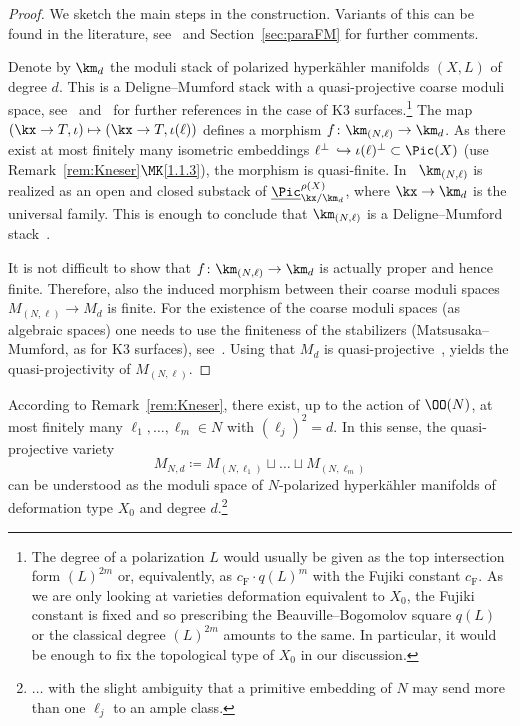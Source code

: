 \begin{proof}
We sketch the main steps in the construction. Variants of this can be found in the literature, see~\cite{Beauv,Dolg} and Section~\ref{sec:paraFM} for further comments.

Denote by $\km_d$ the moduli stack of polarized hyperk\"ahler manifolds $(X,L)$ of degree $d$. This is a Deligne--Mumford stack with a quasi-projective coarse moduli space, see~\cite{Viehweg} and~\cite[Chapter~5]{HuyK3} for further references in the case of K3 surfaces.\footnote{The degree of a polarization $L$ would usually be given as the top intersection form $(L)^{2m}$ or, equivalently, as $c_{\text{F}}\cdot q(L)^m$ with the Fujiki constant $c_{\text{F}}$. As we are only looking at varieties deformation equivalent to $X_0$, the Fujiki constant is fixed and so prescribing the Beauville--Bogomolov square $q(L)$ or the classical degree $(L)^{2m}$ amounts to the same. In particular, it would be enough to fix the topological type of $X_0$ in our discussion.} The map $(\kx\to T,\iota)\mapsto (\kx\to T,\iota(\ell))$ defines a morphism $f\colon\km_{(N,\ell)}\to\km_d$. As there exist at most finitely many isometric embeddings $\ell^\perp\,\hookrightarrow \iota(\ell)^\perp\subset \Pic(X)$ (use Remark~\ref{rem:Kneser}$\MK$\eqref{1.1.3}), the morphism is quasi-finite. In~\cite{Beauv} $\km_{(N,\ell)}$ is realized as an open and closed substack of $\underline\Pic_{\kx/\km_d}^{\rho(X)}$, where $\kx\to\km_d$ is the universal family. This is enough to conclude that $\km_{(N,\ell)}$ is a Deligne--Mumford stack~\cite[Proposition~4.5]{LM}.

It is not difficult to show that $f\colon\km_{(N,\ell)}\to\km_d$ is actually proper and hence finite. Therefore, also the induced morphism between their coarse moduli spaces $M_{(N,\ell)}\to M_d$ is finite. For the existence of the coarse moduli spaces (as algebraic spaces) one needs to use the finiteness of the stabilizers (Matsusaka--Mumford, as for K3 surfaces), see~\cite{KM}. Using that $M_d$ is quasi-projective~\cite{Viehweg}, yields the quasi-projectivity of $M_{(N,\ell)}$.
\end{proof}

According to Remark~\ref{rem:Kneser}, there exist, up to the action of $\OO(N)$, at most finitely many $\ell_1,\dots,\ell_m\in N$ with $(\ell_j)^2=d$. In this sense, the quasi-projective variety
\[
M_{N,d}\coloneqq M_{(N,\ell_1)}\sqcup\dots\sqcup M_{(N,\ell_m)}
\]
can be understood as the moduli space of $N$-polarized hyperk\"ahler manifolds of deformation type $X_0$ and degree $d$.\footnote{$\dots$ with the slight ambiguity that a primitive embedding of $N$ may send more than one $\ell_j$ to an ample class.}

